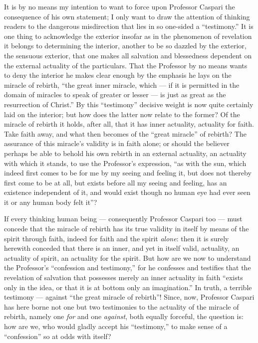 \documentclass[12pt]{book}
\newcommand{\opage}[1]{\marginnote{\footnotesize\textit{[#1]}}}
\begin{document}
It is by no means my intention to want to force upon Professor Caspari
the consequence of his own statement; I only want to draw the attention
of thinking readers to the dangerous misdirection that lies in so
one-sided a ``testimony.'' It is one thing to acknowledge the exterior
insofar as in the phenomenon of revelation it belongs to determining the
interior, another to be so dazzled by the exterior, the sensuous exterior,
that one makes all salvation and blessedness dependent on the external
actuality of the particulars. That the Professor by no means wants to deny
the interior he makes clear enough by the emphasis he lays on the miracle
of rebirth, ``the great inner miracle, which --- if it is permitted in the
domain of miracles to speak of greater or lesser --- is just as great as
the resurrection of Christ.'' By this ``testimony'' decisive weight is
now quite certainly laid on the interior; but how does the latter now
relate to the former? Of the miracle of rebirth it holds, after all, that
it has inner actuality, actuality for faith. Take faith away, and what
then becomes of the ``great miracle'' of rebirth? The assurance of this
miracle's validity is in faith alone; or should the believer perhaps be
able to behold his own rebirth in an external actuality, an actuality
with which it stands, to use the Professor's expression, ``as with the
sun, which indeed first comes to be for me by my seeing and feeling it,
but does not thereby first come to be at all, but exists before all my
seeing
\opage{302}\setcounter{footnote}{0}%
and feeling, has an existence independent of it, and would exist though
no human eye had ever seen it or any human body felt it''?

If every thinking human being --- consequently Professor Caspari too ---
must concede that the miracle of rebirth has its true validity in itself
by means of the spirit through faith, indeed for faith and the spirit
\emph{alone}: then it is surely herewith conceded that there is an inner,
and yet in itself valid, actuality, an actuality of spirit, an actuality
for the spirit. But how are we now to understand the Professor's
``confession and testimony,'' for he confesses and testifies that the
revelation of salvation that possesses merely an inner actuality in faith
``exists only in the idea, or that it is at bottom only an imagination.''
In truth, a terrible testimony --- against ``the great miracle of
rebirth''! Since, now, Professor Caspari has here borne not one but two
testimonies to the actuality of the miracle of rebirth, namely one
\emph{for} and one \emph{against}, both equally forceful, the question is:
how are we, who would gladly accept his ``testimony,'' to make sense of a
``confession'' so at odds with itself?
\end{document}
